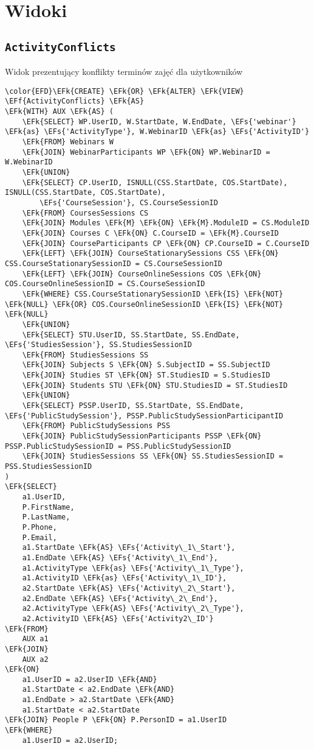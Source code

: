 \documentclass[11pt]{article}
\newcommand{\EFs}[1]{\textcolor{EFs}{#1}} %
\newcommand{\EFk}[1]{\textcolor{EFk}{\textbf{#1}}} %
\newcommand{\EFf}[1]{\textcolor{EFf}{#1}} %
\begin{document}
\section{Widoki}
\label{sec:org995521c}
\subsection{\texttt{ActivityConflicts}}
\label{sec:org469132f}
Widok prezentujący konflikty terminów zajęć dla użytkowników
\begin{Code}
\begin{Verbatim}
\color{EFD}\EFk{CREATE} \EFk{OR} \EFk{ALTER} \EFk{VIEW} \EFf{ActivityConflicts} \EFk{AS}
\EFk{WITH} AUX \EFk{AS} (
    \EFk{SELECT} WP.UserID, W.StartDate, W.EndDate, \EFs{'webinar'} \EFk{as} \EFs{'ActivityType'}, W.WebinarID \EFk{as} \EFs{'ActivityID'}
    \EFk{FROM} Webinars W 
    \EFk{JOIN} WebinarParticipants WP \EFk{ON} WP.WebinarID = W.WebinarID
    \EFk{UNION}
    \EFk{SELECT} CP.UserID, ISNULL(CSS.StartDate, COS.StartDate), ISNULL(CSS.StartDate, COS.StartDate),
        \EFs{'CourseSession'}, CS.CourseSessionID
    \EFk{FROM} CoursesSessions CS 
    \EFk{JOIN} Modules \EFk{M} \EFk{ON} \EFk{M}.ModuleID = CS.ModuleID
    \EFk{JOIN} Courses C \EFk{ON} C.CourseID = \EFk{M}.CourseID
    \EFk{JOIN} CourseParticipants CP \EFk{ON} CP.CourseID = C.CourseID
    \EFk{LEFT} \EFk{JOIN} CourseStationarySessions CSS \EFk{ON} CSS.CourseStationarySessionID = CS.CourseSessionID
    \EFk{LEFT} \EFk{JOIN} CourseOnlineSessions COS \EFk{ON} COS.CourseOnlineSessionID = CS.CourseSessionID
    \EFk{WHERE} CSS.CourseStationarySessionID \EFk{IS} \EFk{NOT} \EFk{NULL} \EFk{OR} COS.CourseOnlineSessionID \EFk{IS} \EFk{NOT} \EFk{NULL}
    \EFk{UNION}
    \EFk{SELECT} STU.UserID, SS.StartDate, SS.EndDate, \EFs{'StudiesSession'}, SS.StudiesSessionID
    \EFk{FROM} StudiesSessions SS
    \EFk{JOIN} Subjects S \EFk{ON} S.SubjectID = SS.SubjectID
    \EFk{JOIN} Studies ST \EFk{ON} ST.StudiesID = S.StudiesID
    \EFk{JOIN} Students STU \EFk{ON} STU.StudiesID = ST.StudiesID
    \EFk{UNION}
    \EFk{SELECT} PSSP.UserID, SS.StartDate, SS.EndDate, \EFs{'PublicStudySession'}, PSSP.PublicStudySessionParticipantID
    \EFk{FROM} PublicStudySessions PSS 
    \EFk{JOIN} PublicStudySessionParticipants PSSP \EFk{ON} PSSP.PublicStudySessionID = PSS.PublicStudySessionID
    \EFk{JOIN} StudiesSessions SS \EFk{ON} SS.StudiesSessionID = PSS.StudiesSessionID
)
\EFk{SELECT} 
    a1.UserID, 
    P.FirstName, 
    P.LastName, 
    P.Phone,
    P.Email,
    a1.StartDate \EFk{AS} \EFs{'Activity\_1\_Start'}, 
    a1.EndDate \EFk{AS} \EFs{'Activity\_1\_End'}, 
    a1.ActivityType \EFk{as} \EFs{'Activity\_1\_Type'},
    a1.ActivityID \EFk{as} \EFs{'Activity\_1\_ID'},
    a2.StartDate \EFk{AS} \EFs{'Activity\_2\_Start'}, 
    a2.EndDate \EFk{AS} \EFs{'Activity\_2\_End'},
    a2.ActivityType \EFk{AS} \EFs{'Activity\_2\_Type'},
    a2.ActivityID \EFk{AS} \EFs{'Activity2\_ID'}
\EFk{FROM} 
    AUX a1
\EFk{JOIN} 
    AUX a2 
\EFk{ON} 
    a1.UserID = a2.UserID \EFk{AND} 
    a1.StartDate < a2.EndDate \EFk{AND} 
    a1.EndDate > a2.StartDate \EFk{AND}
    a1.StartDate < a2.StartDate
\EFk{JOIN} People P \EFk{ON} P.PersonID = a1.UserID
\EFk{WHERE} 
    a1.UserID = a2.UserID;
\end{Verbatim}
\end{Code}
\end{document}
